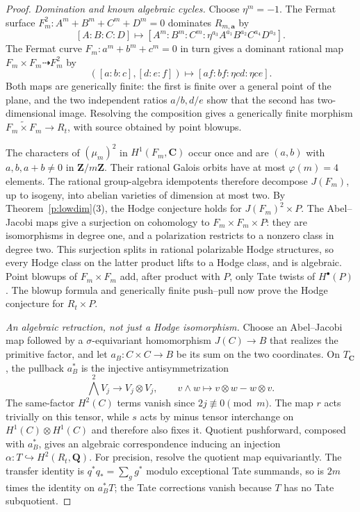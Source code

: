 \documentclass[10pt,reqno]{article}
\theoremstyle{emphasizedplain}
\theoremstyle{emphasizeddefinition}
\theoremstyle{emphasizeddefinition}
\newcommand{\Q}{\mathbf Q}
\newcommand{\C}{\mathbf C}
\newcommand{\Z}{\mathbf Z}
\begin{document}
\begin{proof}
\emph{Domination and known algebraic cycles.} Choose $\eta^m=-1$. The Fermat surface
$F_m^2:A^m+B^m+C^m+D^m=0$ dominates $R_{m,\boldsymbol a}$ by
\[
 [A:B:C:D]\longmapsto
 [A^m:B^m:C^m:\eta^{a_3} A^{a_1}B^{a_2}C^{a_4}D^{a_3}].
\]
The Fermat curve $F_m:a^m+b^m+c^m=0$ in turn gives a dominant
rational map $F_m\times F_m\dashrightarrow F_m^2$ by
\[
 ([a:b:c],[d:e:f])\longmapsto[af:bf:\eta cd:\eta ce].
\]
Both maps are generically finite: the first is finite over a general
point of the plane, and the two independent ratios $a/b,d/e$
show that the second has two-dimensional image. Resolving the
composition gives a generically finite morphism
$\widetilde{F_m\times F_m}\to R_t$, with source obtained by
point blowups.

The characters of $(\mu_m)^2$ in $H^1(F_m,\C)$ occur once and
are $(a,b)$ with $a,b,a+b\ne0$ in $\Z/m\Z$. Their rational
Galois orbits have at most $\varphi(m)=4$ elements. The rational
group-algebra idempotents therefore decompose $J(F_m)$, up to
isogeny, into abelian varieties of dimension at most two.
By Theorem~\ref{p:lowdim}(3), the Hodge conjecture holds for
$J(F_m)^2\times P$. The Abel--Jacobi maps give a surjection on
cohomology to $F_m\times F_m\times P$: they are isomorphisms in
degree one, and a polarization restricts to a nonzero class in
degree two. This surjection splits in rational polarizable Hodge
structures, so every Hodge class on the latter product lifts to a
Hodge class, and is algebraic. Point blowups of $F_m\times F_m$
add, after product with $P$, only Tate twists of $H^\bullet(P)$.
The blowup formula and generically finite push--pull now prove
the Hodge conjecture for $R_t\times P$.

\emph{An algebraic retraction, not just a Hodge isomorphism.}
Choose an Abel--Jacobi map followed by a $\sigma$-equivariant homomorphism
$J(C)\to B$ that realizes the primitive factor, and let
$a_B:C\times C\to B$ be its sum on the two coordinates.
On $T_\C$, the pullback $a_B^*$ is the injective antisymmetrization
\[
 \bigwedge^2 V_j\longrightarrow V_j\otimes V_j,
 \qquad v\wedge w\longmapsto v\otimes w-w\otimes v.
\]
The same-factor $H^2(C)$ terms vanish since $2j\not\equiv0\pmod m$.
The map $r$ acts trivially on this tensor, while $s$ acts by minus
tensor interchange on $H^1(C)\otimes H^1(C)$ and therefore also
fixes it. Quotient pushforward, composed with $a_B^*$, gives an
algebraic correspondence inducing an injection
$\alpha:T\hookrightarrow H^2(R_t,\Q)$.
For precision, resolve the quotient map equivariantly. The transfer
identity is $q^*q_*=\sum_g g^*$ modulo exceptional Tate summands,
so is $2m$ times the identity on $a_B^*T$; the Tate corrections
vanish because $T$ has no Tate subquotient.


\end{proof}
\end{document}

